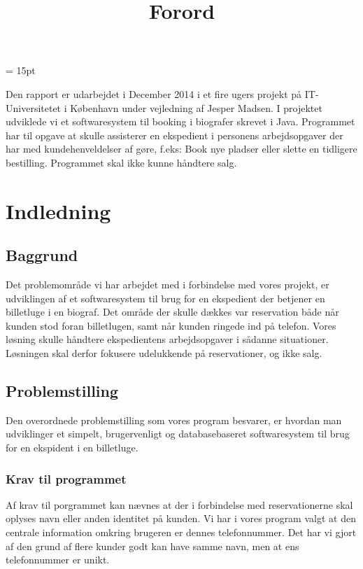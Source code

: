 \documentclass[final]{report}
\begin{document}
\begin{titlepage}

\end{titlepage}






 
\baselineskip= 15pt

\title{Forord}
Den rapport er udarbejdet i December 2014 i et fire ugers projekt på IT-Universitetet i København under vejledning af Jesper Madsen.
I projektet udviklede vi et softwaresystem til booking i biografer skrevet i Java. Programmet har til opgave at skulle assisterer en ekspedient i personens arbejdsopgaver der har med kundehenveldelser af gøre, f.eks: Book nye pladser eller slette en tidligere bestilling. Programmet skal ikke kunne håndtere salg.

\tableofcontents

\chapter{Indledning}
\section{Baggrund}
Det problemområde vi har arbejdet med i forbindelse med vores projekt, er udviklingen af et softwaresystem til brug for en ekspedient der betjener en billetluge i en biograf. Det område der skulle dækkes var reservation både når kunden stod foran billetlugen, samt når kunden ringede ind på telefon. Vores løsning skulle håndtere   ekspedientens arbejdsopgaver i sådanne situationer. Løsningen skal derfor fokusere udelukkende på reservationer, og ikke salg. 

\section{Problemstilling}
Den overordnede problemstilling som vores program besvarer, er hvordan man udviklinger et simpelt, brugervenligt og databasebaseret softwaresystem til brug for en ekspident i en billetluge. 

\subsection{Krav til programmet}
Af krav til porgrammet kan nævnes at der i forbindelse med reservationerne skal oplyses navn eller anden identitet på kunden. Vi har i vores program valgt at den centrale information omkring brugeren er dennes telefonnummer. Det har vi gjort af den grund af flere kunder godt kan have samme navn, men at ens telefonnummer er unikt.  
\end{document}
